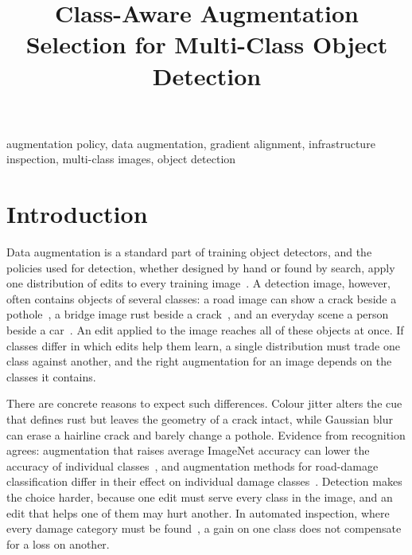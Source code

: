 \documentclass[conference]{IEEEtran}
\begin{document}
\title{Class-Aware Augmentation Selection for Multi-Class Object Detection}
\maketitle


\begin{IEEEkeywords}
augmentation policy, data augmentation, gradient alignment, infrastructure inspection, multi-class images, object detection
\end{IEEEkeywords}

\section{Introduction}
\label{sec:intro}

Data augmentation is a standard part of training object detectors, and the policies used for detection, whether designed by hand or found by search, apply one distribution of edits to every training image~\cite{zoph2020det,chen2021scale}. A detection image, however, often contains objects of several classes: a road image can show a crack beside a pothole~\cite{arya2024rdd}, a bridge image rust beside a crack~\cite{flotzinger2024dacl10k}, and an everyday scene a person beside a car~\cite{everingham2010voc}. An edit applied to the image reaches all of these objects at once. If classes differ in which edits help them learn, a single distribution must trade one class against another, and the right augmentation for an image depends on the classes it contains.

There are concrete reasons to expect such differences. Colour jitter alters the cue that defines rust but leaves the geometry of a crack intact, while Gaussian blur can erase a hairline crack and barely change a pothole. Evidence from recognition agrees: augmentation that raises average ImageNet accuracy can lower the accuracy of individual classes~\cite{kirichenko2023}, and augmentation methods for road-damage classification differ in their effect on individual damage classes~\cite{tsuchiya2019}. Detection makes the choice harder, because one edit must serve every class in the image, and an edit that helps one of them may hurt another. In automated inspection, where every damage category must be found~\cite{shang2024automated,zheng2024deep,vision2025inspection}, a gain on one class does not compensate for a loss on another.
\end{document}

